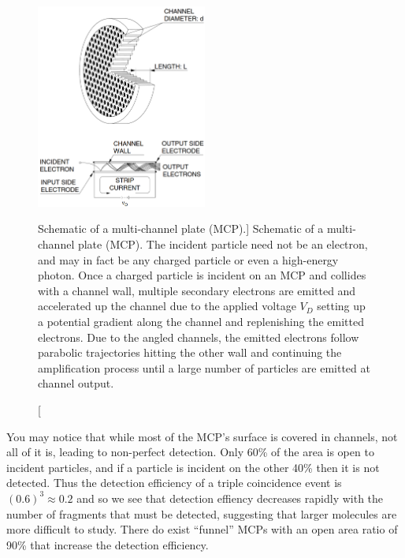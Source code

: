 
\begin{figure}
  \centering
  \includegraphics[width=0.50\textwidth]{gfx/MCP}
  \caption
  [Schematic of a multi-channel plate (MCP).]
  {Schematic of a multi-channel plate (MCP). The incident particle need not be an electron, and may in fact be any charged particle or even a high-energy photon. Once a charged particle is incident on an MCP and collides with a channel wall, multiple secondary electrons are emitted and accelerated up the channel due to the applied voltage $V_D$ setting up a potential gradient along the channel and replenishing the emitted electrons. Due to the angled channels, the emitted electrons follow parabolic trajectories hitting the other wall and continuing the amplification process until a large number of particles are emitted at channel output.}
  \label{fig:MCP}
\end{figure}

You may notice that while most of the MCP's surface is covered in channels, not all of it is, leading to non-perfect detection. Only 60\% of the area is open to incident particles, and if a particle is incident on the other 40\% then it is not detected. Thus the detection efficiency of a triple coincidence event is $(0.6)^3 \approx 0.2$ and so we see that detection effiency decreases rapidly with the number of fragments that must be detected, suggesting that larger molecules are more difficult to study. There do exist ``funnel'' MCPs with an open area ratio of 90\% that increase the detection efficiency.

